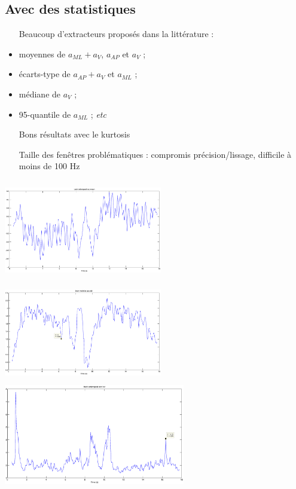\documentclass{beamer}
\begin{document}
\subsection{Avec des statistiques}
\begin{frame}
\begin{itemize}
\item[Beaucoup] d'extracteurs proposés dans la littérature :
\item moyennes de $a_{ML}+a_V$, $a_{AP}$ et $a_V$ ;
\item écarts-type de $a_{AP}+a_V$ et $a_{ML}$ ;
\item médiane de $a_V$ ;
\item 95-quantile de $a_{ML}$ ; \emph{etc}

\item[Bons] résultats avec le kurtosis
\item[Taille] des fenêtres problématiques : compromis précision/lissage, difficile à moins de 100 Hz
\end{itemize}
\end{frame}

\begin{frame}
\hspace*{-2cm}\includegraphics[height=4.4cm,width=6.9cm]{examplew16moyAap}\includegraphics[height=4.4cm,width=6.9cm]{examplew16stdAml}
\\\includegraphics[height=4.4cm]{examplew16kurAap}
\end{frame}
\end{document}

